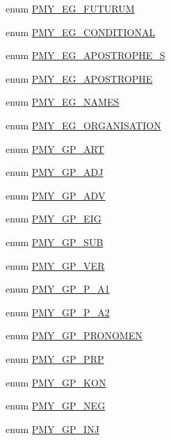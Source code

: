 \begin{DoxyCompactItemize}
\item 
enum \hyperlink{gramtab__consts_8php_aea0f9a7c1be2ce8acc43687abfe4c9e8}{PMY\_\-EG\_\-FUTURUM} 
\item 
enum \hyperlink{gramtab__consts_8php_a15543ff54fa79f3fdddcb5048f0283db}{PMY\_\-EG\_\-CONDITIONAL} 
\item 
enum \hyperlink{gramtab__consts_8php_a1934369b03c3f35c32c7b033ccc5a1d5}{PMY\_\-EG\_\-APOSTROPHE\_\-S} 
\item 
enum \hyperlink{gramtab__consts_8php_a88bab31f08bf5b3a2ead497cb373df8d}{PMY\_\-EG\_\-APOSTROPHE} 
\item 
enum \hyperlink{gramtab__consts_8php_a706369e75b535c0e9befb0a95ca4d44c}{PMY\_\-EG\_\-NAMES} 
\item 
enum \hyperlink{gramtab__consts_8php_adfb0d4809f0e502dc4dac5bb3834f7f4}{PMY\_\-EG\_\-ORGANISATION} 
\item 
enum \hyperlink{gramtab__consts_8php_a9ec8def3a0ea7fc2bfa5d925088e1c14}{PMY\_\-GP\_\-ART} 
\item 
enum \hyperlink{gramtab__consts_8php_a4e26146873d246802d8bf494699f7f07}{PMY\_\-GP\_\-ADJ} 
\item 
enum \hyperlink{gramtab__consts_8php_a0be5f24dc9126b684a54d3f1c19d655b}{PMY\_\-GP\_\-ADV} 
\item 
enum \hyperlink{gramtab__consts_8php_a802d50b3692b407b92cf936ad082339f}{PMY\_\-GP\_\-EIG} 
\item 
enum \hyperlink{gramtab__consts_8php_a33d5c90b2631cc11015044447efec4c3}{PMY\_\-GP\_\-SUB} 
\item 
enum \hyperlink{gramtab__consts_8php_aedb751842aa55f396f8598e2305f8687}{PMY\_\-GP\_\-VER} 
\item 
enum \hyperlink{gramtab__consts_8php_af93bf0d0f61d303b7a03ef6b03e0fde3}{PMY\_\-GP\_\-P\_\-A1} 
\item 
enum \hyperlink{gramtab__consts_8php_af99c644ffc0d05fd121b8962f4a98b06}{PMY\_\-GP\_\-P\_\-A2} 
\item 
enum \hyperlink{gramtab__consts_8php_ab1e1e395c07d3e98c8a3233ba8b51db4}{PMY\_\-GP\_\-PRONOMEN} 
\item 
enum \hyperlink{gramtab__consts_8php_a26aba5ebf148d0fa54c03c8f3f8197f4}{PMY\_\-GP\_\-PRP} 
\item 
enum \hyperlink{gramtab__consts_8php_a0d705605a6890f6a179944563dbe1399}{PMY\_\-GP\_\-KON} 
\item 
enum \hyperlink{gramtab__consts_8php_a7a25bd8c5f23c2e3d81cff608bb5211c}{PMY\_\-GP\_\-NEG} 
\item 
enum \hyperlink{gramtab__consts_8php_ac58ada0644040efcb300b957e8718a09}{PMY\_\-GP\_\-INJ} 

\end{DoxyCompactItemize}
